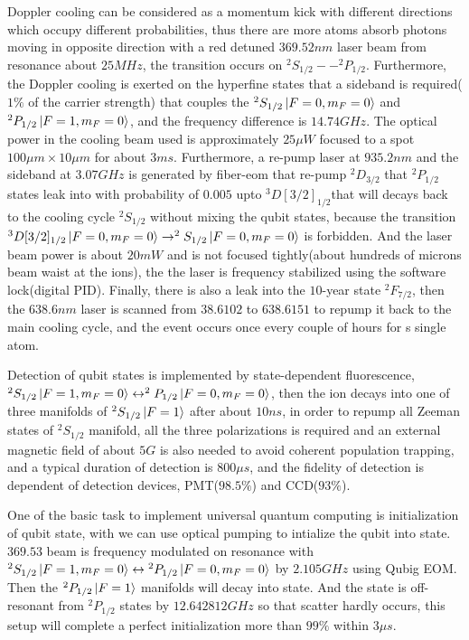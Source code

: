 Doppler cooling can be considered as a momentum kick with different directions which occupy different probabilities, thus there are more atoms absorb photons moving in opposite direction with a red detuned $369.52\unit{nm}$ laser beam from resonance about $25\unit{MHz}$, the transition occurs on $^2S_{1/2}--^2P_{1/2}$. Furthermore, the Doppler cooling is exerted on the hyperfine states that a sideband is required($1\%$ of the carrier strength) that couples the $^2S_{1/2}\ket{F=0,m_F=0}$ and $^2P_{1/2}\ket{F=1,m_F=0}$, and the frequency difference is $14.74\unit{GHz}$. The optical power in the cooling beam used is approximately $25\unit{\mu W}$ focused to a spot $100\unit{\mu m}\times 10\unit{\mu m}$ for about $3\unit{ms}$. Furthermore, a re-pump laser at $935.2\unit{nm}$ and the sideband at $3.07\unit{GHz}$ is generated by fiber-eom that re-pump $^2D_{3/2}$ that $^2P_{1/2}$ states leak into with probability of $0.005$ upto $^3D[3/2]_{1/2}$that will decays back to the cooling cycle $^2S_{1/2}$ without mixing the qubit states, because the transition $^3D[3/2]_{1/2}\ket{F=0,m_F=0}\rightarrow^2S_{1/2}\ket{F=0,m_F=0}$ is forbidden. And the laser beam power is about $20\unit{mW}$ and is not focused tightly(about hundreds of microns beam waist at the ions), the the laser is frequency stabilized using the software lock(digital PID). Finally, there is also a leak into the $10$-year state $^2F_{7/2}$, then the $638.6\unit{nm}$ laser is scanned from $38.6102$ to $638.6151$ to repump it back to the main cooling cycle, and the event occurs once every couple of hours for s single atom.

Detection of qubit states is implemented by state-dependent fluorescence, $^2S_{1/2}\ket{F=1,m_F=0}\leftrightarrow ^2P_{1/2}\ket{F=0,m_F=0}$, then the ion decays into one of three manifolds of $^2S_{1/2}\ket{F=1}$ after about $10\unit{ns}$, in order to repump all Zeeman states of $^2S_{1/2}$ manifold, all the three polarizations is required and an external magnetic field of about $5\unit{G}$ is also needed to avoid coherent population trapping, and a typical duration of detection is $800\unit{\mu s}$, and the fidelity of detection is dependent of detection devices, PMT($98.5\%$) and CCD($93\%$).

One of the basic task to implement universal quantum computing is initialization of qubit state, with  we can use optical pumping to intialize the qubit into \dark state. $369.53$ beam is frequency modulated on resonance with $\mbox{$^2S_{1/2}\ket{F=1,m_F=0}$}\leftrightarrow {^2}P_{1/2}\ket{F=0,m_F=0}$ by $2.105\unit{GHz}$ using Qubig EOM. Then the $^2P_{1/2}\ket{F=1}$ manifolds will decay into \dark state. And the \dark state is off-resonant from $^2P_{1/2}$ states by $12.642812\unit{GHz}$ so that scatter hardly occurs, this setup will complete a perfect initialization more than $99\%$ within $3\unit{\mu s}$.

